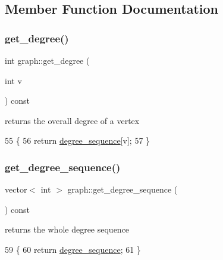 \subsection{Member Function Documentation}
\mbox{\label{classgraph_a593245054bf5ded344fbf304bcdc7fbe}} 
\subsubsection{\texorpdfstring{get\+\_\+degree()}{get\_degree()}}
{\footnotesize\ttfamily int graph\+::get\+\_\+degree (\begin{DoxyParamCaption}\item[{int}]{v }\end{DoxyParamCaption}) const}



returns the overall degree of a vertex 


\begin{DoxyCode}
55                                 \{
56   \textcolor{keywordflow}{return} \hyperlink{classgraph_a0b31295672bfe37669c9eb3640977fe6}{degree\_sequence}[v];
57 \}
\end{DoxyCode}
\mbox{\label{classgraph_afdca627df7fb93a7d1d8a547f616e948}} 
\subsubsection{\texorpdfstring{get\+\_\+degree\+\_\+sequence()}{get\_degree\_sequence()}}
{\footnotesize\ttfamily vector$<$ int $>$ graph\+::get\+\_\+degree\+\_\+sequence (\begin{DoxyParamCaption}{ }\end{DoxyParamCaption}) const}



returns the whole degree sequence 


\begin{DoxyCode}
59                                             \{
60   \textcolor{keywordflow}{return} \hyperlink{classgraph_a0b31295672bfe37669c9eb3640977fe6}{degree\_sequence};
61 \}
\end{DoxyCode}
\mbox{\label{classgraph_a388b6ce292a4c49e3853e22bdce978de}} 
